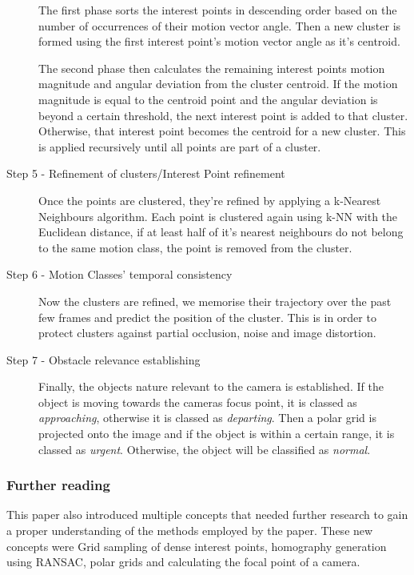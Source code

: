 \begin{description}
	The first phase sorts the interest points in descending order based on the number of occurrences of their motion vector angle. Then a new cluster is formed using the first interest point's motion vector angle as it's centroid.
	
	The second phase then calculates the remaining interest points motion magnitude and angular deviation from the cluster centroid. If the motion magnitude is equal to the centroid point and the angular deviation is beyond a certain threshold, the next interest point is added to that cluster. Otherwise, that interest point becomes the centroid for a new cluster. This is applied recursively until all points are part of a cluster.
	
	\item[Step 5 - Refinement of clusters/Interest Point refinement] Once the points are clustered, they're refined by applying a k-Nearest Neighbours algorithm. Each point is clustered again using k-NN with the Euclidean distance, if at least half of it's nearest neighbours do not belong to the same motion class, the point is removed from the cluster.
	
	\item[Step 6 - Motion Classes' temporal consistency] Now the clusters are refined, we memorise their trajectory over the past few frames and predict the position of the cluster. This is in order to protect clusters against partial occlusion, noise and image distortion.
	
	\item[Step 7 - Obstacle relevance establishing] Finally, the objects nature relevant to the camera is established. If the object is moving towards the cameras focus point, it is classed as {\em approaching}, otherwise it is classed as {\em departing}. Then a polar grid is projected onto the image and if the object is within a certain range, it is classed as {\em urgent}. Otherwise, the object will be classified as {\em normal}.
\end{description}

\subsubsection{Further reading}
This paper also introduced multiple concepts that needed further research to gain a proper understanding of the methods employed by the paper. These new concepts were Grid sampling of dense interest points, homography generation using RANSAC, polar grids and calculating the focal point of a camera.

